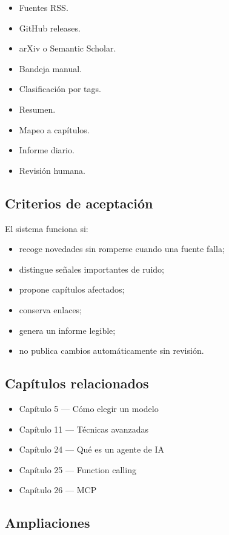 \begin{itemize}
\tightlist
\item
  Fuentes RSS.
\item
  GitHub releases.
\item
  arXiv o Semantic Scholar.
\item
  Bandeja manual.
\item
  Clasificación por tags.
\item
  Resumen.
\item
  Mapeo a capítulos.
\item
  Informe diario.
\item
  Revisión humana.
\end{itemize}

\subsection{Criterios de aceptación}\label{criterios-de-aceptaciuxf3n-2}

El sistema funciona si:

\begin{itemize}
\tightlist
\item
  recoge novedades sin romperse cuando una fuente falla;
\item
  distingue señales importantes de ruido;
\item
  propone capítulos afectados;
\item
  conserva enlaces;
\item
  genera un informe legible;
\item
  no publica cambios automáticamente sin revisión.
\end{itemize}

\subsection{Capítulos relacionados}\label{capuxedtulos-relacionados-2}

\begin{itemize}
\tightlist
\item
  Capítulo 5 --- Cómo elegir un modelo
\item
  Capítulo 11 --- Técnicas avanzadas
\item
  Capítulo 24 --- Qué es un agente de IA
\item
  Capítulo 25 --- Function calling
\item
  Capítulo 26 --- MCP
\end{itemize}

\subsection{Ampliaciones}\label{ampliaciones-2}

